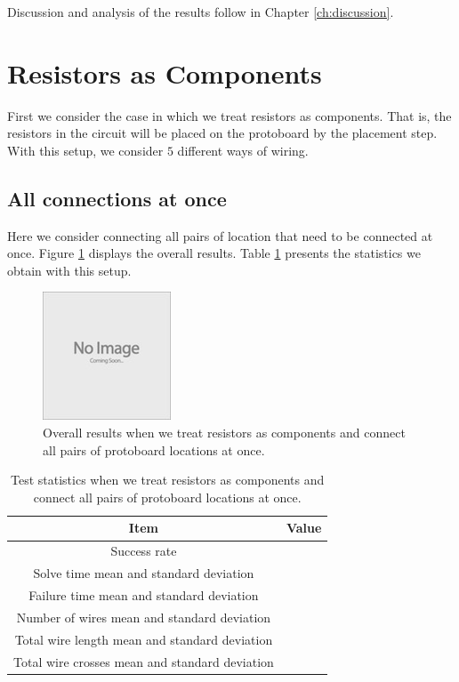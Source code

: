Discussion and analysis of the results follow in Chapter \ref{ch:discussion}.

\section{Resistors as Components}

First we consider the case in which we treat resistors as components. That is,
the resistors in the circuit will be placed on the protoboard by the placement
step. With this setup, we consider $5$ different ways of wiring.

\subsection{All connections at once}

Here we consider connecting all pairs of location that need to
be connected at once. Figure \ref{fig:as_comp_all} displays the overall results.
Table \ref{tb:as_comp_all} presents the statistics we obtain with this setup.

\begin{figure}[H]
\begin{center}
\includegraphics{Images/placeholder.jpg}
\caption{Overall results when we treat resistors as components and connect all
pairs of protoboard locations at once.}
\label{fig:as_comp_all}
\end{center}
\end{figure}

\begin{table}[H]
\begin{center}
\begin{singlespace}
\begin{tabular}{| c | c |}
\hline
Item & Value \\
\hline\hline
Success rate & \\
Solve time mean and standard deviation & \\
Failure time mean and standard deviation & \\
Number of wires mean and standard deviation & \\
Total wire length mean and standard deviation & \\
Total wire crosses mean and standard deviation & \\
\hline
\end{tabular}
\end{singlespace}
\end{center}
\label{tb:as_comp_all}
\caption{Test statistics when we treat resistors as components and connect all
pairs of protoboard locations at once.}
\end{table}

